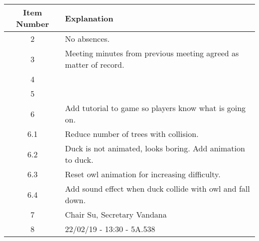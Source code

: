 \documentclass{article}
\begin{document}
\begin{table}[H]
	\centering
	\begin{tabular}{| c | p{9cm} |}
		\hline
		Item Number & Explanation \\ \hline
		2 & No absences.\\ \hline
		3 & Meeting minutes from previous meeting agreed as matter of record. \\ \hline
		4 & \\ \hline
		5 & \\ \hline
		6 & Add tutorial to game so players know what is going on.\\ \hline
		6.1 & Reduce number of trees with collision.\\ \hline
		6.2 & Duck is not animated, looks boring. Add animation to duck.\\ \hline
		6.3 & Reset owl animation for increasing difficulty.\\ \hline
		6.4 & Add sound effect when duck collide with owl and fall down.\\ \hline
		7 & Chair Su, Secretary Vandana\\ \hline
		8 & 22/02/19 - 13:30 - 5A.538   \\ \hline

		
	\end{tabular}
\end{table}
\end{document}
